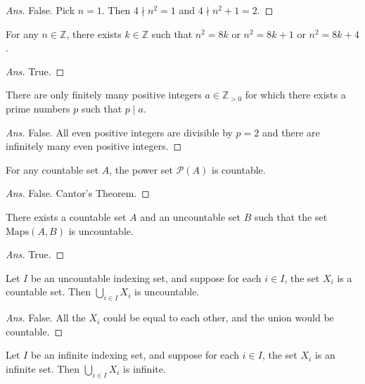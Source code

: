 \documentclass[12pt]{article}
\newenvironment{problem}[2][Problem]{\begin{trivlist}
\item[\hskip \labelsep {\bfseries #1}\hskip \labelsep {\bfseries #2.}]}{\end{trivlist}}
\begin{document}
\begin{proof}[Ans]
False. Pick $n = 1$. Then $ 4 \nmid n^2 = 1$ and $4 \nmid n^2 + 1 = 2$.
\end{proof}

\begin{problem}{33}
For any $n \in \mathbb{Z}$, there exists $k \in \mathbb{Z}$ such that $n^2=8k$ or $n^2=8k+1$ or $n^2=8k+4$. 
\end{problem}

\begin{proof}[Ans]
True.
\end{proof}

\begin{problem}{34}
There are only finitely many positive integers $a \in \mathbb{Z}_{>0} $ for which there exists a prime numbers $p$ such that $p \mid a$.
\end{problem}

\begin{proof}[Ans]
False. All even positive integers are divisible by $p = 2$ and there are infinitely many even positive integers.
\end{proof}

\begin{problem}{35}
For any countable set $A$, the power set $\mathcal{P}(A)$ is countable.
\end{problem}

\begin{proof}[Ans]
False. Cantor's Theorem.
\end{proof}

\begin{problem}{36}
There exists a countable set $A$ and an uncountable set $B$ such that the set $\text{Maps}(A, B)$ is uncountable.
\end{problem}

\begin{proof}[Ans]
True.
\end{proof}

\begin{problem}{37}
Let $I$ be an uncountable indexing set, and suppose for each $i \in I$, the set $X_i$ is a countable set. Then $\bigcup_{i \in I} X_i$ is uncountable.
\end{problem}

\begin{proof}[Ans]
False. All the $X_i$ could be equal to each other, and the union would be countable.
\end{proof}

\begin{problem}{38}
Let $I$ be an infinite indexing set, and suppose for each $i \in I$, the set $X_i$ is an infinite set. Then $\bigcup_{i \in I} X_i$ is infinite.
\end{problem}
\end{document}

